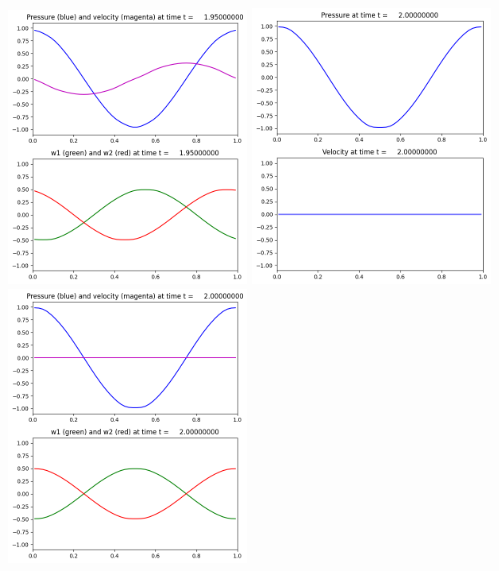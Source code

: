 \documentclass[11pt]{article}
\begin{document}
\includegraphics[width=0.475\textwidth]{frame0039fig2.png}
\vskip 10pt 
\includegraphics[width=0.475\textwidth]{frame0040fig1.png}
\includegraphics[width=0.475\textwidth]{frame0040fig2.png}
\end{document}
